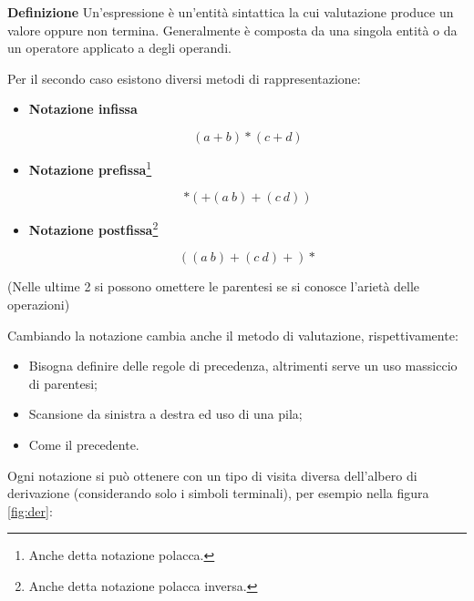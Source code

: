 \documentclass{article}
\newcommand{\df}{\noindent\textbf{Definizione} }
\begin{document}
\df  Un'espressione è un'entità sintattica la cui valutazione produce un valore oppure non termina. Generalmente è composta da una singola entità o da un operatore applicato a degli operandi.\newline

Per il secondo caso esistono diversi metodi di rappresentazione:
\begin{itemize}
    \item \textbf{Notazione infissa}

        $$(a+b)*(c+d)$$
    
    \item \textbf{Notazione prefissa}\footnote{Anche detta notazione polacca.}

        $$*(+(a\ b)+(c\ d))$$
    
    \item \textbf{Notazione postfissa}\footnote{Anche detta notazione polacca inversa.}

        $$((a\ b)+(c\ d)+)*$$
    
\end{itemize}

\vspace{2pt}

\noindent(Nelle ultime 2 si possono omettere le parentesi se si conosce l'arietà delle operazioni)\newline

Cambiando la notazione cambia anche il metodo di valutazione, rispettivamente:
\begin{itemize}
    \item Bisogna definire delle regole di precedenza, altrimenti serve un uso massiccio di parentesi;
    
    \item Scansione da sinistra a destra ed uso di una pila;

    \item Come il precedente.
    
\end{itemize}

Ogni notazione si può ottenere con un tipo di visita diversa dell'albero di derivazione (considerando solo i simboli terminali), per esempio nella figura \ref{fig:der}:

\vspace{4pt}
\end{document}
